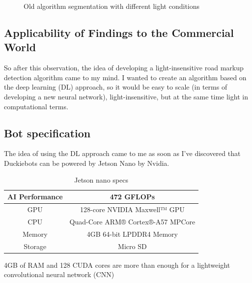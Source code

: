 \begin{figure}[htbp]
    \caption{Old algorithm segmentation with different light conditions}\label{fig:old_masks}
\end{figure}
\subsection{Applicability of Findings to the Commercial World}

So after this observation, the idea of developing a light-insensitive road markup detection algorithm came to my mind. 
I wanted to create an algorithm based on the deep learning (DL) approach, so it would be easy to scale (in terms of developing a new neural network), 
light-insensitive, but at the same time light in computational terms.


\subsection{Bot specification}
The idea of using the DL approach came to me as soon as 
I've discovered that Duckiebots can be powered by Jetson Nano by Nvidia.

\begin{table}[h]
    \centering 
    \begin{tabular}{|c|c|}
        \hline
        AI Performance & 472 GFLOPs \\ \hline
        GPU & 128-core NVIDIA Maxwell™ GPU \\ 	\hline
        CPU & Quad-Core ARM® Cortex®-A57 MPCore  \\ \hline
        Memory & 4GB 64-bit LPDDR4 Memory \\ \hline
        Storage & Micro SD \\\hline
    \end{tabular} %
    \caption{Jetson nano specs} %
    \label{tab:example} %
\end{table} %

4GB of RAM and 128 CUDA cores are more than enough for a lightweight 
convolutional neural network (CNN)